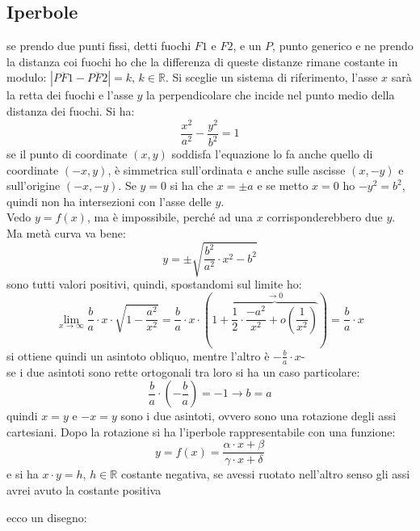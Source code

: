 \documentclass[a4paper,12pt, oneside]{book}
\begin{document}
\subsection{Iperbole}
\begin{definizione}
se prendo due punti fissi, detti fuochi $F1$ e $F2$, e un $P$, punto generico e ne prendo la distanza coi fuochi ho che la differenza di queste distanze rimane costante in modulo: $|\overline{PF1}-\overline{PF2}|=k,\, k\in \mathbb{R}$. Si sceglie un sistema di riferimento, l'asse $x$ sarà la retta dei fuochi e l'asse $y$ la perpendicolare che incide nel punto medio della distanza dei fuochi. Si ha:
$$\frac{x^2}{a^2}-\frac{y^2}{b^2}=1$$
se il punto di coordinate $(x,y)$ soddisfa l'equazione lo fa anche quello di coordinate $(-x,y)$, è simmetrica sull'ordinata e anche sulle ascisse $(x,-y)$ e sull'origine $(-x,-y)$. Se $y=0$ si ha che $x=\pm a$ e se metto $x=0$ ho $-y^2= b^2$, quindi non ha intersezioni con l'asse delle $y$. \\ Vedo $y=f(x)$, ma è impossibile, perché ad una $x$ corrisponderebbero due $y$. Ma metà curva va bene:
$$y=\pm\sqrt{\frac{b^2}{a^2}\cdot x^2-b^2}$$
sono tutti valori positivi, quindi, spostandomi sul limite ho:
$$\lim_{x\to\infty} \frac{b}{a}\cdot x\cdot \sqrt{1-\frac{a^2}{x^2}}= \frac{b}{a}\cdot x\cdot \left(1+\overbrace{\frac{1}{2}\cdot \frac{-a^2}{x^2}+o\left(\frac{1}{x^2}\right)}^{\to 0}\right)=\frac{b}{a}\cdot x$$
si ottiene quindi un asintoto obliquo, mentre l'altro è  $-\frac{b}{a}\cdot x$-\\ se i due asintoti sono rette ortogonali tra loro si ha un caso particolare:
$$\frac{b}{a}\cdot \left(-\frac{b}{a}\right)=-1\longrightarrow b=a$$
quindi $x=y$ e $ -x=y$ sono i due asintoti, ovvero sono una rotazione degli assi cartesiani. Dopo la rotazione si ha l'iperbole rappresentabile con una funzione:
 $$y=f(x)=\frac{\alpha\cdot x +\beta}{\gamma\cdot x +\delta}$$
 e si ha $x\cdot y=h,\, h\in \mathbb{R}$ costante negativa, se avessi ruotato nell'altro senso gli assi avrei avuto la costante positiva

ecco un disegno:
\begin{center}


\end{center}
\end{definizione}
\end{document}
